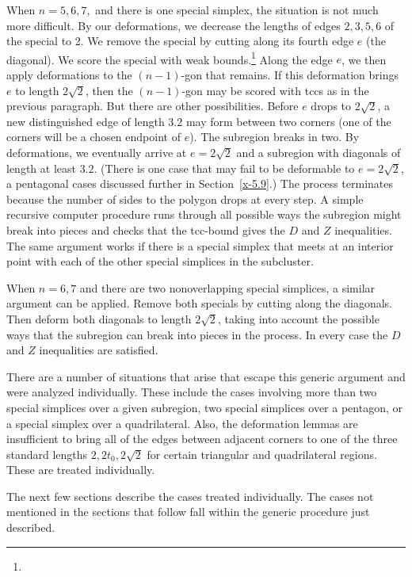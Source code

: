 When $n=5,6,7,$ and there is one special simplex, the situation is not
much more difficult.  By our deformations,  we decrease the lengths of
edges $2,3,5,6$ of the special to 2. We remove the special by cutting
along its fourth edge $e$ (the diagonal).  We score the special with
weak bounds.\footnote{} %
Along the edge $e$, we then apply deformations to the $(n-1)$-gon
that remains. If this deformation brings $e$ to length
$2\sqrt{2}$, then the $(n-1)$-gon may be scored with tccs as in
the previous paragraph.  But there are other possibilities. Before
$e$ drops to $2\sqrt{2}$, a new distinguished edge of length $3.2$
may form between two corners (one of the corners will be a chosen
endpoint of $e$).  The subregion breaks in two. By deformations,
we eventually arrive at $e=2\sqrt2$ and a subregion with diagonals
of length at least $3.2$.  (There is one case that may fail to be
deformable to $e=2\sqrt2$, a pentagonal cases discussed further in
Section~\ref{x-5.9}.) The process terminates because the number of
sides to the polygon drops at every step. A simple recursive
computer procedure runs through all possible ways the subregion
might break into pieces and checks that the tcc-bound gives the
$D$ and $Z$ inequalities. The same argument works if there is a
special simplex that meets at an interior point with each of the
other special simplices in the subcluster.

When $n=6,7$ and there are two nonoverlapping special simplices, a
similar argument can be applied. Remove both specials by cutting along
the diagonals. Then deform both diagonals to length $2\sqrt{2}$, taking
into account the possible ways that the subregion can break into pieces
in the process.  In every case the $D$ and $Z$ inequalities are
satisfied.

There are a number of situations that arise that escape this generic
argument and were analyzed individually. These include the cases
involving more than two special simplices over a given subregion, two
special simplices over a pentagon, or a special simplex over a
quadrilateral.  Also, the deformation lemmas are insufficient to bring
all of the edges between adjacent corners to one of the three standard
lengths $2,2t_0,2\sqrt{2}$ for certain triangular and quadrilateral
regions.  These are treated individually.

The next few sections describe the cases treated individually. The cases
not mentioned in the sections that follow fall within the generic
procedure just described.

